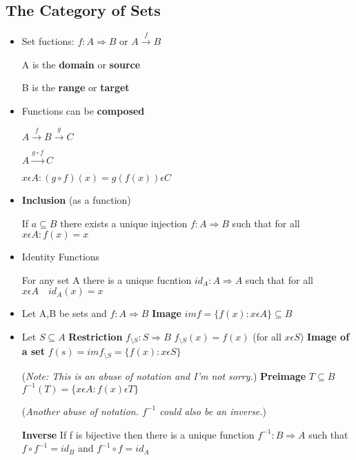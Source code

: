 \documentclass{article}
\theoremstyle{definition}
\theoremstyle{remark}
\begin{document}
\subsection{The Category of Sets}
\begin{itemize}
\item Set fuctions: $f: A \Rightarrow B$ or $A \xrightarrow{f}B$

A is the \textbf{domain} or \textbf{source}

B is the \textbf{range} or \textbf{target}

\item Functions can be \textbf{composed}

$A \xrightarrow{f}B\xrightarrow{g}C$

$A \xrightarrow{g\circ f}C$

$x \epsilon A: (g \circ f)(x) = g(f(x)) \epsilon C$

\item \textbf{Inclusion} (as a function)

If $a \subseteq B$ there exists a unique injection $f: A \Rightarrow B$ such that for all $x \epsilon A: f(x) = x$

\item Identity Functions

For any set A there is a unique fucntion $id_A: A \Rightarrow A$ such that for all $x\epsilon A \quad id_A(x) = x$

\item Let A,B be sets and $f: A \Rightarrow B$
\subitem \textbf{Image}
 $im f = \{f(x): x \epsilon A\} \subseteq B$
 \item Let $S \subseteq A$
 \subitem \textbf{Restriction}
 $f_{\setminus S}: S\Rightarrow B$
 $f_{\setminus S}(x) = f(x)$ (for all $x \epsilon S$)
 \subitem \textbf{Image of a set}
 $f(s) = imf_{\setminus S} = \{f(x): x\epsilon S\}$
 
 (\textit{Note: This is an abuse of notation and I'm not sorry.})
 \subitem \textbf{Preimage}
 $ T \subseteq B$
 $f^{-1}(T) = \{x \epsilon A: f(x) \epsilon T \}$ 
 
 (\textit{Another abuse of notation. $f^{-1}$ could also be an inverse.})
 
 \subitem \textbf{Inverse}
 If f is bijective then there is a unique function $f^{-1}: B \Rightarrow A$ such that $ f\circ f^{-1} = id_B$ and $f^{-1} \circ f = id_A$
\end{itemize}
\end{document}
